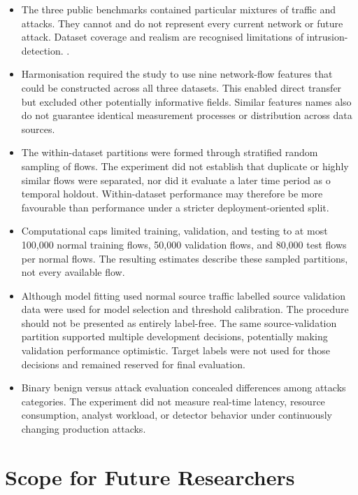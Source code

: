 \begin{itemize}
    \item The three public benchmarks contained particular mixtures of traffic and attacks. They cannot and do not represent every current network 
    or future attack. Dataset coverage and realism are recognised limitations of intrusion-detection.
    \cite{Ring2019,Keyon2020}.
    \item Harmonisation required the study to use nine network-flow features that could be constructed across all three datasets. This enabled direct 
    transfer but excluded other potentially informative fields. Similar features names also do not guarantee identical measurement processes or 
    distribution across data sources.
    \item The within-dataset partitions were formed through stratified random sampling of flows. The experiment did not establish that duplicate 
    or highly similar flows were separated, nor did it evaluate a later time period as o temporal holdout. Within-dataset performance may therefore 
    be more favourable than performance under a stricter deployment-oriented split.
    \item Computational caps limited training, validation, and testing to at most 100,000 normal training flows, 50,000 validation flows, and 80,000 
    test flows per normal flows. The resulting estimates describe these sampled partitions, not every available flow.
    \item Although model fitting used normal source traffic labelled source validation data were used for model selection and threshold calibration. 
    The procedure should not be presented as entirely label-free. The same source-validation partition supported multiple development decisions, 
    potentially making validation performance optimistic. Target labels were not used for those decisions and remained reserved for final evaluation.
    \item Binary benign versus attack evaluation concealed differences among attacks categories. The experiment did not measure real-time latency, 
    resource consumption, analyst workload, or detector behavior under continuously changing production attacks.
\end{itemize} 

\section{Scope for Future Researchers}
\label{sec:conclusion-future-research}

